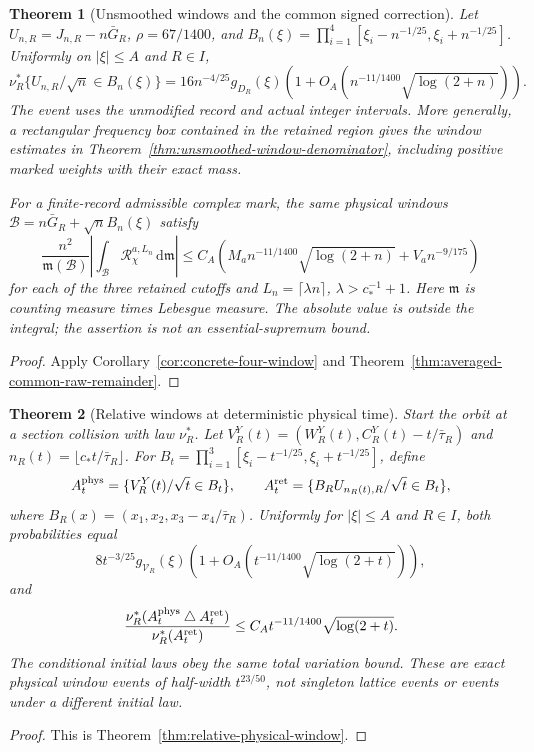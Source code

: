 \documentclass[11pt,reqno]{amsart}
\numberwithin{equation}{section}
\newtheorem{maintheorem}{Theorem}
\theoremstyle{definition}\newtheorem{definition}[theorem]{Definition}
\theoremstyle{remark}\newtheorem{remark}[theorem]{Remark}
\newcommand{\dd}{\,\mathrm d}\newcommand{\one}{\mathbf1}
\begin{document}
\begin{maintheorem}[Unsmoothed windows and the common signed correction]
\label{thm:intro-window-remainder}
Let $U_{n,R}=J_{n,R}-n\bar G_R$, $\rho=67/1400$, and
$B_n(\xi)=\prod_{i=1}^4[\xi_i-n^{-1/25},\xi_i+n^{-1/25}]$.
Uniformly on $|\xi|\le A$ and $R\in I$,
\[
 \nu_R^*\{U_{n,R}/\sqrt n\in B_n(\xi)\}
 =16n^{-4/25}g_{D_R}(\xi)
       \left(1+O_A(n^{-11/1400}\sqrt{\log(2+n)})\right).
\]
The event uses the unmodified record and actual integer intervals.
More generally, a rectangular frequency box contained in the retained
region gives the window estimates in
Theorem~\ref{thm:unsmoothed-window-denominator}, including positive
marked weights with their exact mass.

For a finite-record admissible complex mark, the same physical windows
$\mathcal B=n\bar G_R+\sqrt nB_n(\xi)$ satisfy
\[
 \frac{n^2}{\mathfrak m(\mathcal B)}
 \left|\int_{\mathcal B}\mathcal R_\chi^{a,L_n}\dd\mathfrak m\right|
 \le C_A\left(M_an^{-11/1400}\sqrt{\log(2+n)}+V_an^{-9/175}\right)
\]
for each of the three retained cutoffs and $L_n=\lceil\lambda n\rceil$,
$\lambda>c_*^{-1}+1$. Here $\mathfrak m$ is counting measure times
Lebesgue measure. The absolute value is outside the integral; the
assertion is not an essential-supremum bound.
\end{maintheorem}
\begin{proof}
Apply Corollary~\ref{cor:concrete-four-window} and
Theorem~\ref{thm:averaged-common-raw-remainder}.
\end{proof}

\begin{maintheorem}[Relative windows at deterministic physical time]
\label{thm:intro-relative-physical-window}
Start the orbit at a section collision with law $\nu_R^*$. Let
$V_R^Y(t)=(W_R^Y(t),C_R^Y(t)-t/\bar\tau_R)$ and
$n_R(t)=\lfloor c_*t/\bar\tau_R\rfloor$.
For $B_t=\prod_{i=1}^3[\xi_i-t^{-1/25},\xi_i+t^{-1/25}]$, define
\[
 A_t^{\rm phys}=\{V_R^Y(t)/\sqrt t\in B_t\},\qquad
 A_t^{\rm ret}=\{B_RU_{n_R(t),R}/\sqrt t\in B_t\},
\]
where $B_R(x)=(x_1,x_2,x_3-x_4/\bar\tau_R)$.
Uniformly for $|\xi|\le A$ and $R\in I$, both probabilities equal
\[
 8t^{-3/25}g_{\mathcal V_R}(\xi)
       \left(1+O_A(t^{-11/1400}\sqrt{\log(2+t)})\right),
\]
and
\[
 \frac{\nu_R^*(A_t^{\rm phys}\mathbin\triangle A_t^{\rm ret})}
      {\nu_R^*(A_t^{\rm ret})}
       \le C_A t^{-11/1400}\sqrt{\log(2+t)}.
\]
The conditional initial laws obey the same total variation bound.
These are exact physical window events of half-width $t^{23/50}$,
not singleton lattice events or events under a different initial law.
\end{maintheorem}
\begin{proof}
This is Theorem~\ref{thm:relative-physical-window}.
\end{proof}
\end{document}
